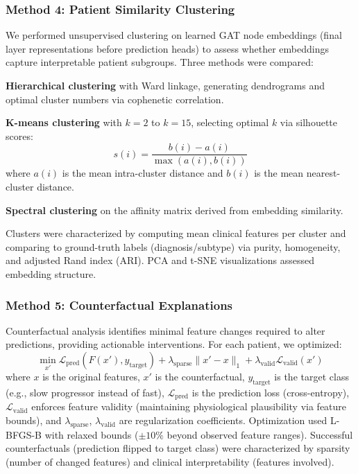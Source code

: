 \subsubsection{Method 4: Patient Similarity Clustering}

We performed unsupervised clustering on learned GAT node embeddings (final layer representations before prediction heads) to assess whether embeddings capture interpretable patient subgroups. Three methods were compared:

\textbf{Hierarchical clustering} with Ward linkage, generating dendrograms and optimal cluster numbers via cophenetic correlation\cite{sokal1962comparison}.

\textbf{K-means clustering} with $k=2$ to $k=15$, selecting optimal $k$ via silhouette scores\cite{rousseeuw1987silhouettes}:
\begin{equation}
s(i) = \frac{b(i) - a(i)}{\max(a(i), b(i))}
\end{equation}
where $a(i)$ is the mean intra-cluster distance and $b(i)$ is the mean nearest-cluster distance.

\textbf{Spectral clustering} on the affinity matrix derived from embedding similarity\cite{ng2001spectral}.

Clusters were characterized by computing mean clinical features per cluster and comparing to ground-truth labels (diagnosis/subtype) via purity, homogeneity, and adjusted Rand index (ARI)\cite{hubert1985comparing}. PCA and t-SNE visualizations\cite{maaten2008visualizing} assessed embedding structure.

\subsubsection{Method 5: Counterfactual Explanations}

Counterfactual analysis identifies minimal feature changes required to alter predictions, providing actionable interventions\cite{wachter2017counterfactual}. For each patient, we optimized:
\begin{equation}
\min_{x'} \mathcal{L}_{\text{pred}}(F(x'), y_{\text{target}}) + \lambda_{\text{sparse}} \|x' - x\|_1 + \lambda_{\text{valid}} \mathcal{L}_{\text{valid}}(x')
\end{equation}
where $x$ is the original features, $x'$ is the counterfactual, $y_{\text{target}}$ is the target class (e.g., slow progressor instead of fast), $\mathcal{L}_{\text{pred}}$ is the prediction loss (cross-entropy), $\mathcal{L}_{\text{valid}}$ enforces feature validity (maintaining physiological plausibility via feature bounds), and $\lambda_{\text{sparse}}$, $\lambda_{\text{valid}}$ are regularization coefficients. Optimization used L-BFGS-B\cite{byrd1995limited} with relaxed bounds ($\pm 10\%$ beyond observed feature ranges). Successful counterfactuals (prediction flipped to target class) were characterized by sparsity (number of changed features) and clinical interpretability (features involved).

